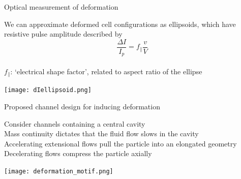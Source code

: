 
\begin{frame}[c]{Optical measurement of deformation}

	{\scriptsize
		We can approximate deformed cell configurations as ellipsoids, which have resistive pulse amplitude described by \\
		
		\[ \frac{\Delta I}{I_{p}}=f_{\parallel}\frac{v}{V} \] \\
		
		$f_{\parallel}$: `electrical shape factor', related to aspect ratio of the ellipse \\
	}

	\vspace{.1in}
	
	{\centering
		\texttt{[image: dIellipsoid.png]} \\
		\par
	}
	
	
\end{frame}


\begin{frame}[c]{Proposed channel design for inducing deformation}

	{\scriptsize
		Consider channels containing a central cavity \\
		\vspace{.1in}
		Mass continuity dictates that the fluid flow slows in the cavity \\
		\vspace{.1in}
		Accelerating extensional flows pull the particle into an elongated geometry \\
		\vspace{.1in}
		Decelerating flows compress the particle axially \\
		\vspace{.1in}
	}
	
	
	{\centering
		\texttt{[image: deformation\_motif.png]} \\
		\par
	}
			

\end{frame}


